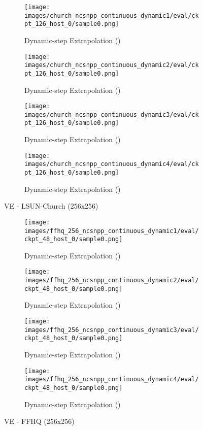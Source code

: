 \documentclass{article}
\begin{document}
\begin{figure}[ht] 
  \begin{subfigure}[b]{0.5\linewidth}
    \centering
    \texttt{[image: images/church\_ncsnpp\_continuous\_dynamic1/eval/ckpt\_126\_host\_0/sample0.png]} 
    \caption{Dynamic-step Extrapolation ()} 
  \end{subfigure}
  \begin{subfigure}[b]{0.5\linewidth}
    \centering
    \texttt{[image: images/church\_ncsnpp\_continuous\_dynamic2/eval/ckpt\_126\_host\_0/sample0.png]}
    \caption{Dynamic-step Extrapolation ()} 
  \end{subfigure}
  \begin{subfigure}[b]{0.5\linewidth}
    \centering
    \texttt{[image: images/church\_ncsnpp\_continuous\_dynamic3/eval/ckpt\_126\_host\_0/sample0.png]} 
    \caption{Dynamic-step Extrapolation ()} 
  \end{subfigure}
  \begin{subfigure}[b]{0.5\linewidth}
    \centering
    \texttt{[image: images/church\_ncsnpp\_continuous\_dynamic4/eval/ckpt\_126\_host\_0/sample0.png]}
    \caption{Dynamic-step Extrapolation ()} 
  \end{subfigure}
  \caption{VE - LSUN-Church (256x256)}
  \label{fig15} 
\end{figure}

\begin{figure}[ht] 
  \begin{subfigure}[b]{0.5\linewidth}
    \centering
    \texttt{[image: images/ffhq\_256\_ncsnpp\_continuous\_dynamic1/eval/ckpt\_48\_host\_0/sample0.png]}
    \caption{Dynamic-step Extrapolation ()} 
  \end{subfigure}
  \begin{subfigure}[b]{0.5\linewidth}
    \centering
    \texttt{[image: images/ffhq\_256\_ncsnpp\_continuous\_dynamic2/eval/ckpt\_48\_host\_0/sample0.png]}
    \caption{Dynamic-step Extrapolation ()} 
  \end{subfigure}
  \begin{subfigure}[b]{0.5\linewidth}
    \centering
    \texttt{[image: images/ffhq\_256\_ncsnpp\_continuous\_dynamic3/eval/ckpt\_48\_host\_0/sample0.png]}
    \caption{Dynamic-step Extrapolation ()} 
  \end{subfigure}
  \begin{subfigure}[b]{0.5\linewidth}
    \centering
    \texttt{[image: images/ffhq\_256\_ncsnpp\_continuous\_dynamic4/eval/ckpt\_48\_host\_0/sample0.png]}
    \caption{Dynamic-step Extrapolation ()} 
  \end{subfigure}
  \caption{VE - FFHQ (256x256)}
  \label{fig16} 
\end{figure}
\end{document}
